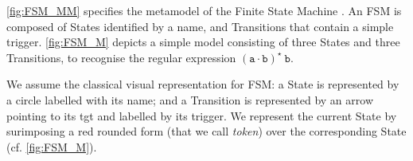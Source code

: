 \autoref{fig:FSM_MM} specifies the metamodel of the Finite State Machine \DSL. 
An \textsf{FSM} is composed of \textsf{State}s identified by a \textsf{name}, and
\textsf{Transition}s that contain a simple \textsf{trigger}. 
\autoref{fig:FSM_M} depicts a simple model consisting of 
three \textsf{State}s and three \textsf{Transition}s, to recognise the regular 
expression $\mathtt{(a\cdot b)^\star\ b}$. 

We assume the classical visual representation for \textsf{FSM}: a \textsf{State}
is represented by a circle labelled with its \textsf{name}; and a 
\textsf{Transition} is represented by an arrow pointing to its \textsf{tgt} and 
labelled by its \textsf{trigger}. We represent the \textsf{current}
\textsf{State} by surimposing a red rounded form (that we call \emph{token}) over
the corresponding \textsf{State} (cf. \autoref{fig:FSM_M}).

